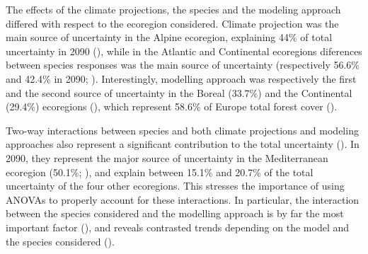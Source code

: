 The effects of the climate projections, the species  and the modeling approach differed with respect to the ecoregion considered. Climate projection was the main source of uncertainty in the Alpine ecoregion, explaining 44\% of total uncertainty in 2090 (), while in the Atlantic and Continental ecoregions diferences between species responses was the main source of uncertainty (respectively 56.6\% and 42.4\% in 2090; ). Interestingly, modelling approach was respectively the first and the second source of uncertainty in the Boreal (33.7\%) and the Continental (29.4\%) ecoregions (), which represent 58.6\% of Europe total forest cover ().

Two-way interactions between species and both climate projections and modeling approaches also represent a significant contribution to the total uncertainty (). In 2090, they represent the major source of uncertainty in the Mediterranean ecoregion  (50.1\%; ), and explain between 15.1\% and 20.7\% of the total uncertainty of the four other ecoregions. This stresses the importance of using ANOVAs to properly account for these interactions. In particular, the interaction between the species considered and the modelling approach is by far the most important factor (), and reveals contrasted trends depending on the model and the species considered (). 


